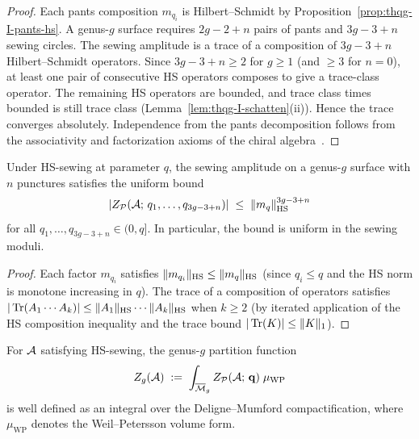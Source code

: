 \begin{proof}
Each pants composition $m_{q_i}$ is Hilbert--Schmidt by Proposition~\ref{prop:thqg-I-pants-hs}. A genus-$g$ surface requires $2g - 2 + n$ pairs of pants and $3g - 3 + n$ sewing circles. The sewing amplitude is a trace of a composition of $3g - 3 + n$ Hilbert--Schmidt operators. Since $3g - 3 + n \geq 2$ for $g \geq 1$ (and $\geq 3$ for $n = 0$), at least one pair of consecutive HS operators composes to give a trace-class operator. The remaining HS operators are bounded, and trace class times bounded is still trace class (Lemma~\ref{lem:thqg-I-schatten}(ii)). Hence the trace converges absolutely. Independence from the pants decomposition follows from the associativity and factorization axioms of the chiral algebra~\cite{BD04, FBZ04}.
\end{proof}

\begin{proposition}
\label{prop:thqg-I-uniform-trace-bound}
Under HS-sewing at parameter $q$, the sewing amplitude on a genus-$g$ surface with $n$ punctures satisfies the uniform bound
\begin{equation}%
|Z_{\mathcal{P}}(\cA;\,q_1,\ldots,q_{3g-3+n})| \;\leq\; \|m_q\|_{\HS}^{3g-3+n}
\end{equation}
for all $q_1, \ldots, q_{3g-3+n} \in (0,q]$. In particular, the bound is uniform in the sewing moduli.
\end{proposition}

\begin{proof}
Each factor $m_{q_i}$ satisfies $\|m_{q_i}\|_{\operatorname{HS}} \leq \|m_q\|_{\operatorname{HS}}$ (since $q_i \leq q$ and the HS norm is monotone increasing in $q$). The trace of a composition of operators satisfies $|\operatorname{Tr}(A_1 \cdots A_k)| \leq \|A_1\|_{\operatorname{HS}}\cdots\|A_k\|_{\operatorname{HS}}$ when $k \geq 2$ (by iterated application of the HS composition inequality and the trace bound $|\operatorname{Tr}(K)| \leq \|K\|_1$).
\end{proof}

\begin{corollary}
\label{cor:thqg-I-genus-g-partition}
For $\mathcal{A}$ satisfying HS-sewing, the genus-$g$ partition function
\begin{equation}%
Z_g(\cA) \;:=\; \int_{\overline{\mathcal{M}}_g} Z_{\mathcal{P}}(\cA;\,\mathbf{q}) \;\mu_{\mathrm{WP}}
\end{equation}
is well defined as an integral over the Deligne--Mumford compactification, where $\mu_{\mathrm{WP}}$ denotes the Weil--Petersson volume form.
\end{corollary}

